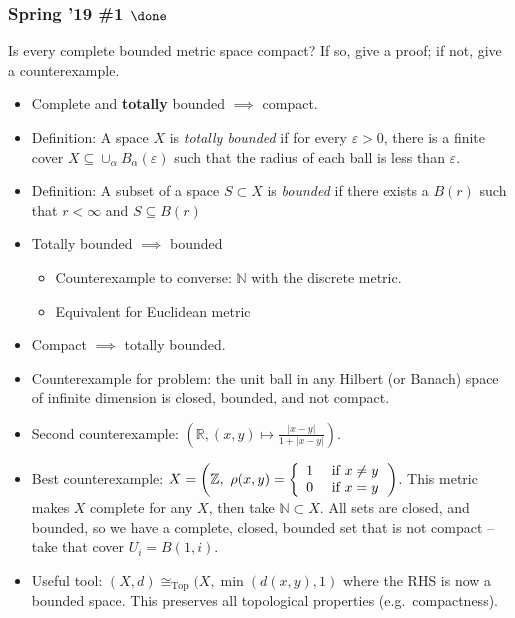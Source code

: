 \hypertarget{spring-19-1-done}{%
\subsubsection{\texorpdfstring{Spring '19 \#1
\(\done\)}{Spring '19 \#1 \textbackslash done}}\label{spring-19-1-done}}

\begin{problem}[?]

Is every complete bounded metric space compact? If so, give a proof; if
not, give a counterexample.

\end{problem}


\begin{concept}

\envlist

\begin{itemize}
\item
  Complete and \textbf{totally} bounded \(\implies\) compact.
\item
  Definition: A space \(X\) is \emph{totally bounded} if for every
  \(\varepsilon >0\), there is a finite cover
  \(X \subseteq \cup_\alpha B_\alpha(\varepsilon)\) such that the radius
  of each ball is less than \(\varepsilon\).
\item
  Definition: A subset of a space \(S \subset X\) is \emph{bounded} if
  there exists a \(B(r)\) such that \(r<\infty\) and
  \(S \subseteq B(r)\)
\item
  Totally bounded \(\implies\) bounded

  \begin{itemize}
  \tightlist
  \item
    Counterexample to converse: \({\mathbb{N}}\) with the discrete
    metric.
  \item
    Equivalent for Euclidean metric
  \end{itemize}
\item
  Compact \(\implies\) totally bounded.
\item
  Counterexample for problem: the unit ball in any Hilbert (or Banach)
  space of infinite dimension is closed, bounded, and not compact.
\item
  Second counterexample:
  \(({\mathbb{R}}, (x,y) \mapsto \frac{{\left\lvert {x-y} \right\rvert}}{1 + {\left\lvert {x-y} \right\rvert}})\).
\item
  Best counterexample:
  \(X = \left({\mathbb{Z}}, ~\rho ( x , y ) = \left\{ \begin{array} { l l } { 1 } & { \text { if } x \neq y } \\ { 0 } & { \text { if } x = y } \end{array} \right.\right)\).
  This metric makes \(X\) complete for any \(X\), then take
  \({\mathbb{N}}\subset X\). All sets are closed, and bounded, so we
  have a complete, closed, bounded set that is not compact -- take that
  cover \(U_i = B(1, i)\).
\item
  Useful tool: \((X, d) \cong_{\text{Top}} (X, \min{(d(x,y), 1)}\) where
  the RHS is now a bounded space. This preserves all topological
  properties (e.g.~compactness).
\end{itemize}


\end{concept}
